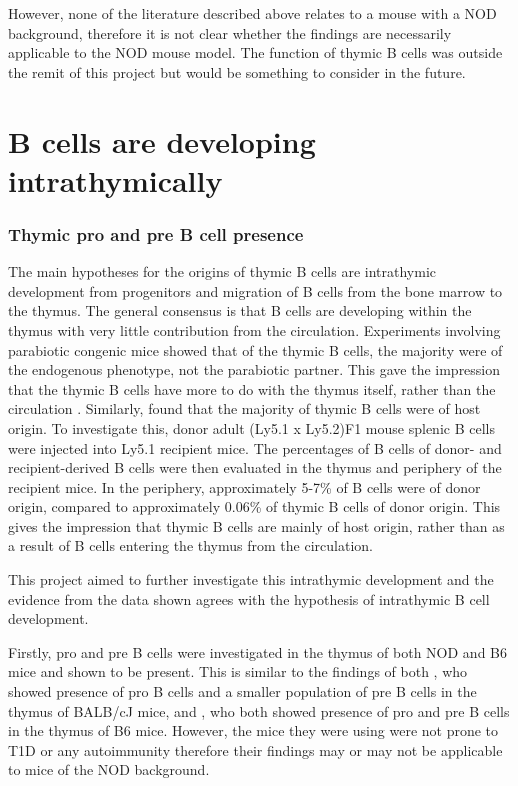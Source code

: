 However, none of the literature described above relates to a mouse with a NOD background, therefore it is not clear whether the findings are necessarily applicable to the NOD mouse model.
The function of thymic B cells was outside the remit of this project but would be something to consider in the future. 

\section{B cells are developing intrathymically}

\subsubsection{Thymic pro and pre B cell presence}
The main hypotheses for the origins of thymic B cells are intrathymic development from progenitors and migration of B cells from the bone marrow to the thymus.
The general consensus is that B cells are developing within the thymus with very little contribution from the circulation.
Experiments involving parabiotic congenic mice showed that of the thymic B cells, the majority were of the endogenous phenotype, not the parabiotic partner. 
This gave the impression that the thymic B cells have more to do with the thymus itself, rather than the circulation \citep{Perera2013}.
Similarly, \citet{Akashi2000} found that the majority of thymic B cells were of host origin.
To investigate this, donor adult (Ly5.1 x Ly5.2)F1 mouse splenic B cells were injected into Ly5.1 recipient mice.
The percentages of B cells of donor- and recipient-derived B cells were then evaluated in the thymus and periphery of the recipient mice.
In the periphery, approximately 5-7\% of B cells were of donor origin, compared to approximately 0.06\% of thymic B cells of donor origin.
This gives the impression that thymic B cells are mainly of host origin, rather than as a result of B cells entering the thymus from the circulation. 

This project aimed to further investigate this intrathymic development and the evidence from the data shown agrees with the hypothesis of intrathymic B cell development.

Firstly, pro and pre B cells were investigated in the thymus of both NOD and B6 mice and shown to be present. 
This is similar to the findings of both \citet{Hashimoto2002}, who showed presence of pro B cells and a smaller population of pre B cells in the thymus of BALB/cJ mice, and \citet{Akashi2000}, who both showed presence of pro and pre B cells in the thymus of B6 mice.
However, the mice they were using were not prone to T1D or any autoimmunity therefore their findings may or may not be applicable to mice of the NOD background.

